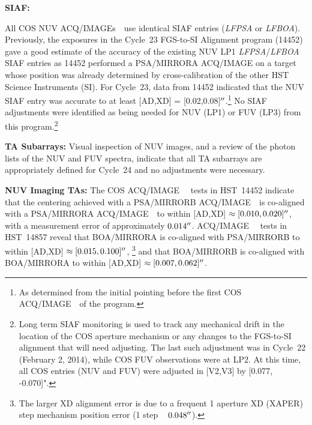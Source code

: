 \documentclass[12pt]{reportj}
\def\arcsec{\hbox{$^{\prime\prime}$}}
\newcommand*{\myfont}{\fontfamily{rm}\selectfont}
\def\acqimage{{\myfont ACQ/IMAGE}\rm~}
\def\acqimages{{\myfont ACQ/IMAGE{\rm s}}\rm~}
\begin{document}
\begin{description}
\item{\bf SIAF:}{
	All COS NUV \acqimages~use identical SIAF entries ({\it LFPSA} or {\it LFBOA}).
	Previously, the exposures in the Cycle~23 FGS-to-SI Alignment program (14452) gave a good estimate of the accuracy of the existing NUV LP1 {\it LFPSA}/{\it LFBOA} SIAF entries
	as 14452 performed a PSA/MIRRORA ACQ/IMAGE on a target whose position was already determined by cross-calibration of the other HST Science Instruments (SI).
	For Cycle~23, data from 14452 indicated that the NUV SIAF entry was accurate to at least [AD,XD] = [0.02,0.08]$\arcsec$.\footnote{As determined from the initial pointing before the first COS \acqimage~of the program.}
	No SIAF adjustments were identified as being needed for NUV (LP1) or FUV (LP3) from this program.\footnote{Long term SIAF monitoring is used to track any mechanical drift in the location of the COS aperture mechanism or any changes to the FGS-to-SI alignment that will need adjusting.
	The last such adjustment was in Cycle~22 (February 2, 2014), while COS FUV observations were at LP2. At this time, all COS entries (NUV and FUV) were adjusted in [V2,V3] by [0.077, -0.070]". }

}
\item{\bf TA Subarrays:} Visual inspection of NUV images, and a review of the photon lists of the NUV and FUV spectra, indicate that all TA subarrays are appropriately defined for Cycle~24 and no adjustments were necessary.
\item{\bf NUV Imaging TAs:}
	The COS \acqimage~ tests in HST~14452 indicate that the centering achieved with a PSA/MIRRORB \acqimage~is co-aligned with a PSA/MIRRORA \acqimage~to within [AD,XD] $\approx [0.010,0.020]\arcsec$, with a measurement error of approximately $0.014\arcsec$.
	\acqimage~ tests in HST~14857 reveal that BOA/MIRRORA is co-aligned with PSA/MIRRORB to within [AD,XD] $\approx [0.015,0.100]\arcsec$,
	\footnote{The larger XD alignment error is due to a frequent 1 aperture XD (XAPER) step mechanism position error (1 step ~ $0.048\arcsec$).}
	and that BOA/MIRRORB is co-aligned with BOA/MIRRORA to within [AD,XD] $\approx [0.007,0.062]\arcsec$.


\end{description}
\end{document}
